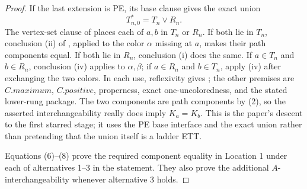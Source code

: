 \begin{proof}
If the last extension is PE, its base clause gives the exact union
\[
                         T_{n,0}^{*}=T_n\vee R_n.
\]
The vertex-set clause of  places each of $a,b$
in $T_n$ or $R_n$.  If both lie in $T_n$, conclusion (ii) of
, applied to the color $\alpha$ missing at $a$,
makes their path components equal.  If both lie in $R_n$, conclusion (i)
does the same.  If $a\in T_n$ and $b\in R_n$, conclusion (iv) applies to
$\alpha,\beta$; if $a\in R_n$ and $b\in T_n$, apply (iv) after exchanging
the two colors.  In each use, reflexivity gives
; the other premises are
$C.\mathit{maximum}$, $C.\mathit{positive}$, properness, exact
one-uncoloredness, and the stated lower-rung package.  The two components
are path components by (2), so the asserted interchangeability really
does imply $K_a=K_b$.  This is the paper's descent to the first starred
stage; it uses the PE base interface and the exact union rather than
pretending that the union itself is a ladder ETT.                       

Equations (6)--(8) prove the required component equality in Location 1
under each of alternatives 1--3 in the statement.  They also prove the
additional $A$-interchangeability whenever alternative 3 holds.
\end{proof}
